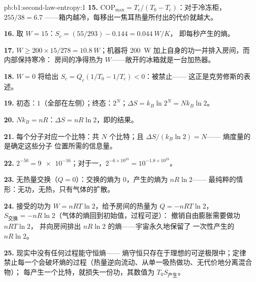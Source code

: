 \begin{solution}{pb:b1:second-law-entropy:1}
\textbf{15.} $\mathrm{COP}_{\max} = T_c/(T_0 - T_c)$：对于冷冻柜，$255/38 = 6.7$
——箱内越冷，每移出一焦耳热量所付出的代价就越大。

\textbf{16.} 取 $W = 15$：$S_c = (55/293) - 0.144 = \qty{0.044}{W/K}$，
即每秒产生的熵。

\textbf{17.} $W \geq 200 \times 15/278 = \qty{10.8}{W}$；机器将
\qty{200}{W} 加上自身的功一并排入房间，而内部保持寒冷：
房间的净得热为 $W$——敞开的冰箱就是一台加热器。

\textbf{18.} $W = 0$ 将给出 $S_c = Q_c(1/T_0 - 1/T_c) < 0$：被禁止——
这正是克劳修斯的表述。

\textbf{19.} 初态：$1$（全部在左侧）；终态：$2^N$；$\Delta S = k_B\ln2^N =
Nk_B\ln2$。

\textbf{20.} $Nk_B = nR$：$\Delta S = nR\ln2$，即的结果。

\textbf{21.} 每个分子对应一个比特：共 $N$ 个比特；且 $\Delta S/(k_B\ln2) = N$——
熵度量的是确定这些分子
位置所需的信息量。

\textbf{22.} $2^{-50} = \num{9e-16}$；对于一，$2^{-6\times10^{23}} =
10^{-1.8\times10^{23}}$。

\textbf{23.} 无热量交换（$Q = 0$）：交换的熵为 $0$，产生的熵为 $nR\ln2$——
最纯粹的情形：无功，无热，只有气体的扩散。

\textbf{24.} 接受的功为 $W = nRT\ln2$，给予房间的热量为 $Q = -nRT\ln2$，
$S_{\text{交换}} = -nR\ln2$（气体的熵回到初始值，过程可逆）：
撤销自由膨胀需要做功 $nRT\ln2$，
并向房间排出 $nR\ln2$ 的熵——宇宙永久地保留了
一次性产生的 $nR\ln2$。

\textbf{25.} 现实中没有任何过程能守恒熵——
熵守恒只存在于理想的可逆极限中；定律
禁止每一个会破坏熵的过程（热量逆向流动、从单一吸热做功、无代价地分离混合物）；
每产生一个比特，就损失一份功，其数值为 $T_0S_{\text{产生}}$。
\end{solution}

